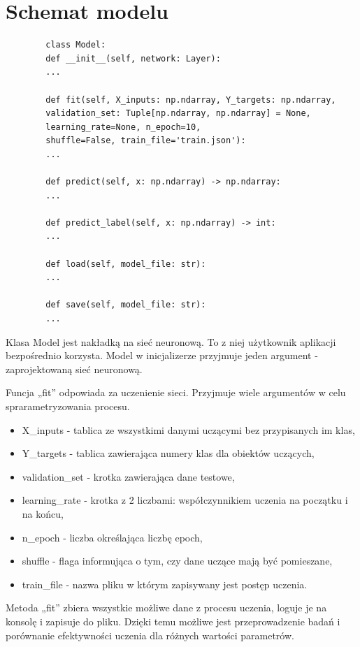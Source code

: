 \documentclass{report}
\begin{document}
    \section{Schemat modelu}\label{sec:schematModelu}

    \begin{lstlisting}
        class Model:
        def __init__(self, network: Layer):
        ...

        def fit(self, X_inputs: np.ndarray, Y_targets: np.ndarray,
        validation_set: Tuple[np.ndarray, np.ndarray] = None,
        learning_rate=None, n_epoch=10,
        shuffle=False, train_file='train.json'):
        ...

        def predict(self, x: np.ndarray) -> np.ndarray:
        ...

        def predict_label(self, x: np.ndarray) -> int:
        ...

        def load(self, model_file: str):
        ...

        def save(self, model_file: str):
        ...
    \end{lstlisting}
    \label{Schemat klasy Model}

    Klasa Model jest nakładką na sieć neuronową.
    To z niej użytkownik aplikacji bezpośrednio korzysta.
    Model w inicjalizerze przyjmuje jeden argument - zaprojektowaną sieć neuronową.

    Funcja „fit” odpowiada za uczenienie sieci.
    Przyjmuje wiele argumentów w celu sprarametryzowania procesu.
    \begin{itemize}
        \item X\_inputs - tablica ze wszystkimi danymi uczącymi bez przypisanych im klas,
        \item Y\_targets - tablica zawierająca numery klas dla obiektów uczących,
        \item validation\_set - krotka zawierająca dane testowe,
        \item learning\_rate - krotka z 2 liczbami: współczynnikiem uczenia na początku i na końcu,
        \item n\_epoch - liczba określająca liczbę epoch,
        \item shuffle - flaga informująca o tym, czy dane uczące mają być pomieszane,
        \item train\_file - nazwa pliku w którym zapisywany jest postęp uczenia.
    \end{itemize}

    Metoda „fit” zbiera wszystkie możliwe dane z procesu uczenia, loguje je na konsolę i zapisuje do pliku.
    Dzięki temu możliwe jest przeprowadzenie badań i porównanie efektywności uczenia dla różnych wartości parametrów.
\end{document}
